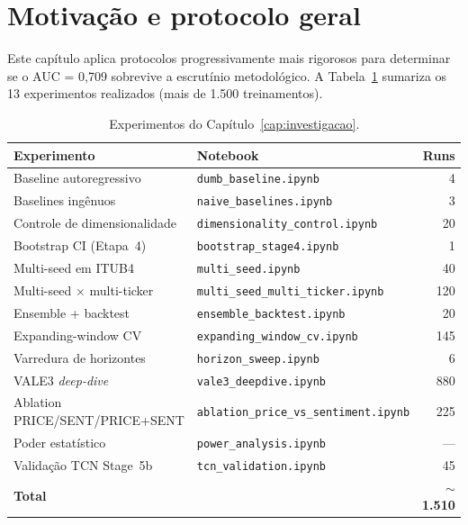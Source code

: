 \documentclass[
    12pt,
    openright,
    oneside,
    a4paper,
    english,
    brazil
]{abntex2}
\begin{document}
\section{Motivação e protocolo geral}

Este capítulo aplica protocolos progressivamente mais rigorosos para determinar se o AUC = 0,709 sobrevive a escrutínio metodológico. A Tabela~\ref{tab:experimentos} sumariza os 13 experimentos realizados (mais de 1.500 treinamentos).

\begin{table}[htb]
\centering
\caption{Experimentos do Capítulo~\ref{cap:investigacao}.}\label{tab:experimentos}
\begin{tabular}{llr}
\toprule
\textbf{Experimento} & \textbf{Notebook} & \textbf{Runs} \\
\midrule
Baseline autoregressivo          & \texttt{dumb\_baseline.ipynb}                & 4   \\
Baselines ingênuos               & \texttt{naive\_baselines.ipynb}              & 3   \\
Controle de dimensionalidade     & \texttt{dimensionality\_control.ipynb}       & 20  \\
Bootstrap CI (Etapa~4)           & \texttt{bootstrap\_stage4.ipynb}             & 1   \\
Multi-seed em ITUB4              & \texttt{multi\_seed.ipynb}                   & 40  \\
Multi-seed $\times$ multi-ticker & \texttt{multi\_seed\_multi\_ticker.ipynb}     & 120 \\
Ensemble + backtest              & \texttt{ensemble\_backtest.ipynb}             & 20  \\
Expanding-window CV              & \texttt{expanding\_window\_cv.ipynb}          & 145 \\
Varredura de horizontes          & \texttt{horizon\_sweep.ipynb}                & 6   \\
VALE3 \textit{deep-dive}        & \texttt{vale3\_deepdive.ipynb}               & 880 \\
Ablation PRICE/SENT/PRICE+SENT  & \texttt{ablation\_price\_vs\_sentiment.ipynb} & 225 \\
Poder estatístico                & \texttt{power\_analysis.ipynb}               & --- \\
Validação TCN Stage~5b           & \texttt{tcn\_validation.ipynb}               & 45  \\
\midrule
\textbf{Total}                   &                                              & \textbf{$\sim$1.510} \\
\bottomrule
\end{tabular}
\end{table}
\end{document}
